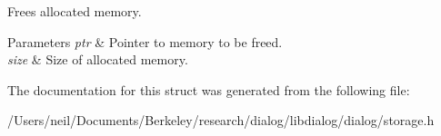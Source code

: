 Frees allocated memory.


\begin{DoxyParams}{Parameters}
{\em ptr} & Pointer to memory to be freed. \\
\hline
{\em size} & Size of allocated memory. \\
\hline
\end{DoxyParams}


The documentation for this struct was generated from the following file\+:\begin{DoxyCompactItemize}
\item 
/\+Users/neil/\+Documents/\+Berkeley/research/dialog/libdialog/dialog/storage.\+h\end{DoxyCompactItemize}
